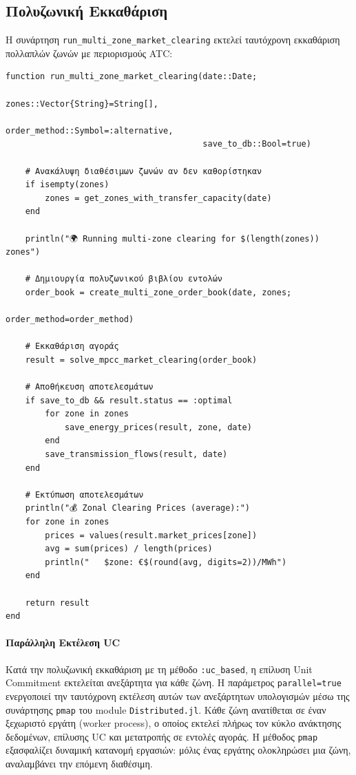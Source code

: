 \subsection{Πολυζωνική Εκκαθάριση}
\label{subsec:multi-zone-clearing}

Η συνάρτηση \texttt{run\_multi\_zone\_market\_clearing} εκτελεί ταυτόχρονη εκκαθάριση πολλαπλών ζωνών με περιορισμούς ATC:

\begin{samepage}
\begin{verbatim}
function run_multi_zone_market_clearing(date::Date;
                                        zones::Vector{String}=String[],
                                        order_method::Symbol=:alternative,
                                        save_to_db::Bool=true)
    
    # Ανακάλυψη διαθέσιμων ζωνών αν δεν καθορίστηκαν
    if isempty(zones)
        zones = get_zones_with_transfer_capacity(date)
    end
    
    println("🌍 Running multi-zone clearing for $(length(zones)) zones")
    
    # Δημιουργία πολυζωνικού βιβλίου εντολών
    order_book = create_multi_zone_order_book(date, zones; 
                                              order_method=order_method)
    
    # Εκκαθάριση αγοράς
    result = solve_mpcc_market_clearing(order_book)
    
    # Αποθήκευση αποτελεσμάτων
    if save_to_db && result.status == :optimal
        for zone in zones
            save_energy_prices(result, zone, date)
        end
        save_transmission_flows(result, date)
    end
    
    # Εκτύπωση αποτελεσμάτων
    println("💰 Zonal Clearing Prices (average):")
    for zone in zones
        prices = values(result.market_prices[zone])
        avg = sum(prices) / length(prices)
        println("   $zone: €$(round(avg, digits=2))/MWh")
    end
    
    return result
end
\end{verbatim}
\end{samepage}

\paragraph{Παράλληλη Εκτέλεση UC}
Κατά την πολυζωνική εκκαθάριση με τη μέθοδο \texttt{:uc\_based}, η επίλυση Unit Commitment εκτελείται ανεξάρτητα για κάθε ζώνη. Η παράμετρος \texttt{parallel=true} ενεργοποιεί την ταυτόχρονη εκτέλεση αυτών των ανεξάρτητων υπολογισμών μέσω της συνάρτησης \texttt{pmap} του module \texttt{Distributed.jl}. Κάθε ζώνη ανατίθεται σε έναν ξεχωριστό εργάτη (worker process), ο οποίος εκτελεί πλήρως τον κύκλο ανάκτησης δεδομένων, επίλυσης UC και μετατροπής σε εντολές αγοράς. Η μέθοδος \texttt{pmap} εξασφαλίζει δυναμική κατανομή εργασιών: μόλις ένας εργάτης ολοκληρώσει μια ζώνη, αναλαμβάνει την επόμενη διαθέσιμη.

